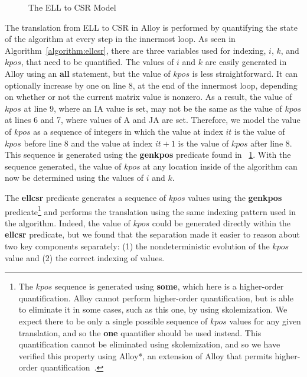 \begin{figure}

\caption{The ELL to CSR Model}
\label{alloy:csrell}
\end{figure}

The translation from ELL to CSR in Alloy is performed by quantifying the state of the algorithm at every step in the innermost loop.  As seen in Algorithm~\ref{algorithm:ellcsr}, there are three variables used for indexing, $i$, $k$, and $kpos$, that need to be quantified.  The values of $i$ and $k$ are easily generated in Alloy using an \textbf{all} statement, but the value of $kpos$ is less straightforward.
It can optionally increase by one on line 8, at the end of the innermost loop, depending on whether or not the current matrix value is nonzero.
As a result, the value of $kpos$ at line 9, where an IA value is set, may not be the same as the value of $kpos$ at lines 6 and 7, where values of A and JA are set.
Therefore, we model the value of $kpos$ as a sequence of integers in which the value at index $it$ is the value of $kpos$ before line 8 and the value at index $it+1$ is the value of $kpos$ after line 8.
This sequence is generated using the \textbf{genkpos} predicate found in \figurename~\ref{alloy:csrell}.  With the sequence generated, the value of $kpos$ at any location inside of the algorithm can now be determined using the values of $i$ and $k$.

The \textbf{ellcsr} predicate generates a sequence of $kpos$ values using the \textbf{genkpos} predicate\footnote{The $kpos$ sequence is generated using \textbf{some}, which here is a higher-order quantification.  Alloy cannot perform higher-order quantification, but is able to eliminate it in some cases, such as this one, by using skolemization.  We expect there to be only a single possible sequence of $kpos$ values for any given translation, and so the \textbf{one} quantifier should be used instead.  This quantification cannot be eliminated using skolemization, and so we have verified this property using Alloy*, an extension of Alloy that permits higher-order quantification~\cite{alloy*}.} and performs the translation using the same indexing pattern used in the algorithm.  Indeed, the value of $kpos$ could be generated directly within the \textbf{ellcsr} predicate, but we found that the separation made it easier to reason about two key components separately: (1) the nondeterministic evolution of the $kpos$ value and (2) the correct indexing of values.


